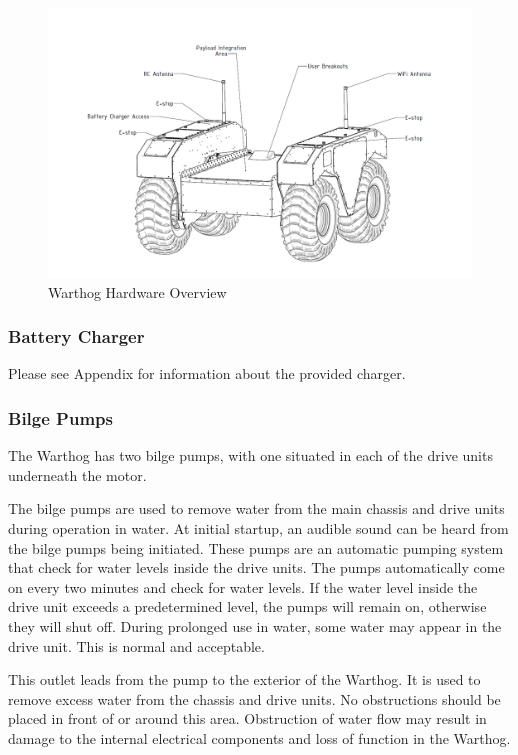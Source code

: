 \documentclass[]{clearpath-latex/clearpath-manual}
\begin{document}
\begin{figure}[h]
  \centering
  \includegraphics[width=1\linewidth]{Warthog_Drawing_Labeled.PNG}
  \caption{Warthog Hardware Overview}
  \label{Warthog_overview}
\end{figure}





\pagebreak[4]
\subsubsection{Battery Charger}
Please see Appendix for information about the provided charger.

\subsubsection{Bilge Pumps}\label{bilgepumps}
The Warthog has two bilge pumps, with one situated in each of the drive units underneath the motor.

The bilge pumps are used to remove water from the main chassis and drive units during operation in water. At initial startup, an audible sound can be heard from the bilge pumps being initiated. These pumps are an automatic pumping system that check for water levels inside the drive units. The pumps automatically come on every two minutes and check for water levels. If the water level inside the drive unit exceeds a predetermined level, the pumps will remain on, otherwise they will shut off. During prolonged use in water, some water may appear in the drive unit. This is normal and acceptable.


This outlet leads from the pump to the exterior of the Warthog. It is used to remove excess water from the chassis and drive units. No obstructions should be placed in front of or around this area. Obstruction of water flow may result in damage to the internal electrical components and loss of function in the Warthog.
\end{document}
